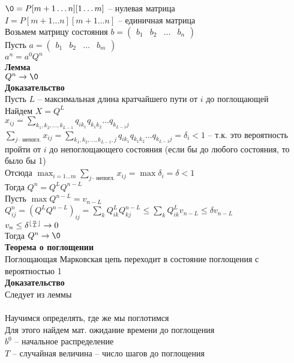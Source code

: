 \documentclass[12pt]{article}
\begin{document}
$\0 = P[m+1\ldots n][1\ldots m]$ -- нулевая матрица \\
$I = P[m+1\ldots n][m+1\ldots n]$ -- единичная матрица\\
Возьмем матрицу состояния $b = \begin{pmatrix} b_1 & b_2 & \ldots & b_n \end{pmatrix}$\\
Пусть $a = \begin{pmatrix} b_1 & b_2 & \ldots & b_m \end{pmatrix}$\\
$a^n = a^0 Q^n$\\
\textbf{Лемма}\\
$Q^n \rto \0$\\
\textbf{Доказательство}\\
Пусть $L$ -- максимальная длина кратчайшего пути от $i$ до поглощающей\\
Найдем $X = Q^L$\\
$x_{ij} = \sum_{k_1, k_2, \ldots, k_{L-1}} q_{ik_1}q_{k_1 k_2}\ldots q_{k_{L-1}j}$\\
$\sum_{j \text{-- непогл.}}x_{ij} = \sum_{k_1, k_2, \ldots, k_{L-1}, j} q_{ik_1}q_{k_1 k_2}\ldots q_{k_{L-1}j} = \delta_i < 1$ -- т.к. это вероятность пройти от $i$ до непоглощающего состояния (если бы до любого состояния, то было бы 1)\\
Отсюда $\max_{i=1\ldots m} \sum_{j \text{-- непогл.}}x_{ij} = \max \delta_i = \delta < 1$\\
Тогда $Q^n = Q^L Q^{n-L}$\\
Пусть $\max Q^{n-L} = v_{n-L}$\\
$Q^n_{ij} = (Q^L Q^{n-L})_{ij} = \sum_k Q^L_{ik} Q^{n-L}_{kj} \leq \sum_k Q^L_{ik} v_{n-L} \leq \delta v_{n-L}$\\
$v_n \leq \delta^{\lfloor \frac nL \rfloor} \rightarrow 0$\\
Тогда $Q^n \rto \0$\\
\textbf{Теорема о поглощении}\\
Поглощающая Марковская цепь переходит в состояние поглощения с вероятностью 1\\
\textbf{Доказательство}\\
Следует из леммы\\\\
Научимся определять, где же мы поглотимся\\
Для этого найдем мат. ожидание времени до поглощения\\
$b^0$ -- начальное распределение\\
$T$ -- случайная величина -- число шагов до поглощения\\
\end{document}
